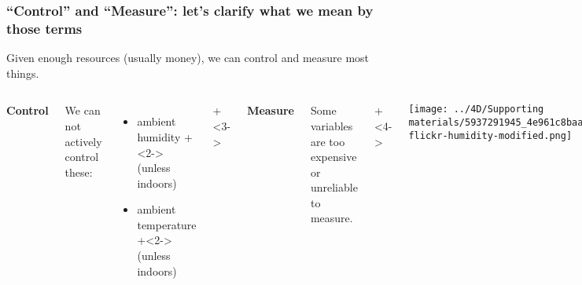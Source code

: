 \begin{frame}\frametitle{``Control'' and ``Measure'': let's clarify what we mean by those terms}
	
	{\color{myOrange}Given enough resources (usually money), we can control and measure most things.}
	
	\begin{columns}[T]
			\begin{center}\textbf{Control}\end{center}
				
			We can not actively control these:
			\begin{itemize}
				\item	ambient humidity \onslide+<2->{(unless indoors)}
				\item	ambient temperature \onslide+<2->{(unless indoors)}
			\end{itemize}
			
			\vspace{1cm}
			
		
			\onslide+<3->{
				\begin{center}\textbf{Measure}\end{center}
			
				Some variables are too expensive or unreliable to measure.
			
				\onslide+<4->{
					\begin{center}
						\texttt{[image: ../4D/Supporting materials/5937291945\_4e961c8baa\_o-flickr-humidity-modified.png]}
					\end{center}
				}
			}
			
	\end{columns}
	
\end{frame}

